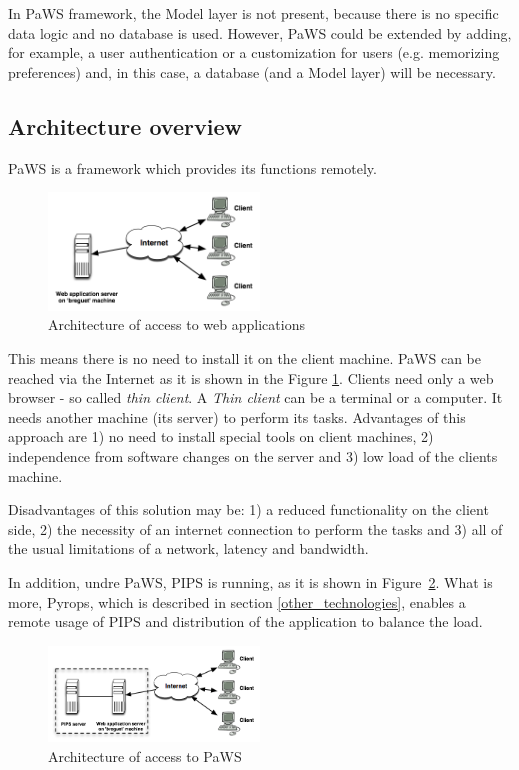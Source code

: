In PaWS framework, the Model layer is not present, because there is no
specific data logic and no database is used. However, PaWS could be
extended by adding, for example, a user authentication or a customization
for users (e.g. memorizing preferences) and, in this case, a database
(and a Model layer) will be necessary.

\subsection{Architecture overview}

PaWS is a framework which provides its functions remotely. 
\begin{figure}[h!]
  \centering
  \includegraphics[width=0.5\textwidth]{reportCh2/web_applications}
  \caption{Architecture of access to web applications}
  \label{fig:web_applications}
\end{figure}
This means there is no need to install it on the client machine.  PaWS
can be reached via the Internet as it is shown in the Figure
\ref{fig:web_applications}. Clients need only a web browser - so
called \emph{thin client}. A \emph{Thin client} can be a terminal or a
computer. It needs another machine (its server) to perform its
tasks. Advantages of this approach are 1) no need to install special
tools on client machines, 2) independence from software changes on the
server and 3) low load of the clients machine.

Disadvantages of this solution may be: 1) a reduced functionality
on the client side, 2) the necessity of  an internet connection to
perform the tasks and 3) all of the usual limitations of a network,
latency and bandwidth.

In addition, undre PaWS, PIPS is running, as it is shown in
Figure~\ref{fig:webapp_paws}. What is more, Pyrops, which is described
in section \ref{other_technologies}, enables a remote usage of PIPS and
distribution of the application to balance the load.


\begin{figure}[h!]
  \centering
  \includegraphics[width=0.5\textwidth]{reportCh2/webapp_paws}
  \caption{Architecture of access to PaWS}
  \label{fig:webapp_paws}
\end{figure}

